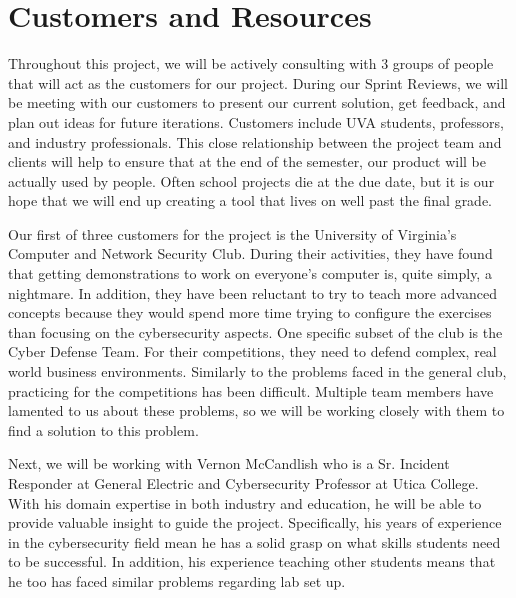 \documentclass[openright]{report}
\begin{document}
\section{Customers and Resources}

\par Throughout this project, we will be actively consulting with 3 groups of people that will act as the customers for our project. During our Sprint Reviews, we will be meeting with our customers to present our current solution, get feedback, and plan out ideas for future iterations. Customers include UVA students, professors, and industry professionals. This close relationship between the project team and clients will help to ensure that at the end of the semester, our product will be actually used by people. Often school projects die at the due date, but it is our hope that we will end up creating a tool that lives on well past the final grade.

\par Our first of three customers for the project is the University of Virginia's Computer and Network Security Club. During their activities, they have found that getting demonstrations to work on everyone's computer is, quite simply, a nightmare. In addition, they have been reluctant to try to teach more advanced concepts because they would spend more time trying to configure the exercises than focusing on the cybersecurity aspects. One specific subset of the club is the Cyber Defense Team. For their competitions, they need to defend complex, real world business environments. Similarly to the problems faced in the general club, practicing for the competitions has been difficult. Multiple team members have lamented to us about these problems, so we will be working closely with them to find a solution to this problem.

\par Next, we will be working with Vernon McCandlish who is a Sr. Incident Responder at General Electric and Cybersecurity Professor at Utica College. With his domain expertise in both industry and education, he will be able to provide valuable insight to guide the project. Specifically, his years of experience in the cybersecurity field mean he has a solid grasp on what skills students need to be successful. In addition, his experience teaching other students means that he too has faced similar problems regarding lab set up.
\end{document}
